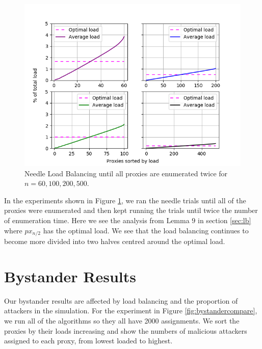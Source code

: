
\begin{figure}[h!]
\centering
     \includegraphics[width=1.0\textwidth]{fig/load_balance_needle_to_twice_enum_60_100_200_500.png}
    \caption{Needle Load Balancing until all proxies are enumerated twice for $n=60, 100, 200, 500$.}

    \label{fig:needlelb2}
\end{figure}


In the experiments shown in Figure \ref{fig:needlelb2}, we ran the needle trials until all of the proxies were enumerated and then kept running the trials until twice the number of enumeration time. Here we see the analysis from Lemma $9$ in section \ref{sec:lb} where $px_{n/2}$ has the optimal load. We see that the load balancing continues to become more divided into two halves centred around the optimal load. 


\section{Bystander Results}

Our bystander results are affected by load balancing and the proportion of attackers in the simulation. For the experiment in Figure \ref{fig:bystandercompare}, we run all of the algorithms so they all have 2000 assignments. We sort the proxies by their loads increasing and show the numbers of malicious attackers assigned to each proxy, from lowest loaded to highest.

